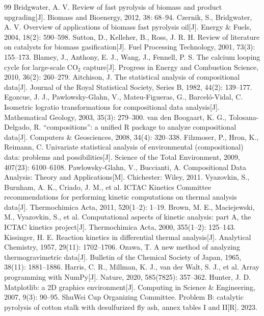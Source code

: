 \documentclass[withoutpreface,bwprint]{apmcmthesis}
\begin{document}
\begin{thebibliography}{99}
 Bridgwater, A. V. Review of fast pyrolysis of biomass and product upgrading[J]. Biomass and Bioenergy, 2012, 38: 68--94.
 Czernik, S., Bridgwater, A. V. Overview of applications of biomass fast pyrolysis oil[J]. Energy \& Fuels, 2004, 18(2): 590--598.
 Sutton, D., Kelleher, B., Ross, J. R. H. Review of literature on catalysts for biomass gasification[J]. Fuel Processing Technology, 2001, 73(3): 155--173.
 Blamey, J., Anthony, E. J., Wang, J., Fennell, P. S. The calcium looping cycle for large-scale CO$_2$ capture[J]. Progress in Energy and Combustion Science, 2010, 36(2): 260--279.
 Aitchison, J. The statistical analysis of compositional data[J]. Journal of the Royal Statistical Society, Series B, 1982, 44(2): 139--177.
 Egozcue, J. J., Pawlowsky-Glahn, V., Mateu-Figueras, G., Barcel\'o-Vidal, C. Isometric logratio transformations for compositional data analysis[J]. Mathematical Geology, 2003, 35(3): 279--300.
 van den Boogaart, K. G., Tolosana-Delgado, R. ``compositions'': a unified R package to analyze compositional data[J]. Computers \& Geosciences, 2008, 34(4): 320--338.
 Filzmoser, P., Hron, K., Reimann, C. Univariate statistical analysis of environmental (compositional) data: problems and possibilities[J]. Science of the Total Environment, 2009, 407(23): 6100--6108.
 Pawlowsky-Glahn, V., Buccianti, A. Compositional Data Analysis: Theory and Applications[M]. Chichester: Wiley, 2011.
 Vyazovkin, S., Burnham, A. K., Criado, J. M., et al. ICTAC Kinetics Committee recommendations for performing kinetic computations on thermal analysis data[J]. Thermochimica Acta, 2011, 520(1--2): 1--19.
 Brown, M. E., Maciejewski, M., Vyazovkin, S., et al. Computational aspects of kinetic analysis: part A, the ICTAC kinetics project[J]. Thermochimica Acta, 2000, 355(1--2): 125--143.
 Kissinger, H. E. Reaction kinetics in differential thermal analysis[J]. Analytical Chemistry, 1957, 29(11): 1702--1706.
 Ozawa, T. A new method of analyzing thermogravimetric data[J]. Bulletin of the Chemical Society of Japan, 1965, 38(11): 1881--1886.
 Harris, C. R., Millman, K. J., van der Walt, S. J., et al. Array programming with NumPy[J]. Nature, 2020, 585(7825): 357--362.
 Hunter, J. D. Matplotlib: a 2D graphics environment[J]. Computing in Science \& Engineering, 2007, 9(3): 90--95.
 ShuWei Cup Organizing Committee. Problem B: catalytic pyrolysis of cotton stalk with desulfurized fly ash, annex tables I and II[R]. 2023.
\end{thebibliography}
\end{document}
